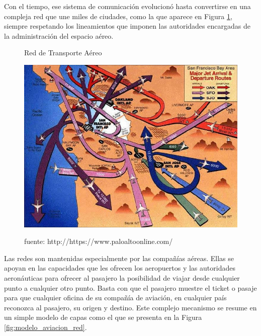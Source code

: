 Con el tiempo, ese sistema de comunicación evolucionó hasta convertirse en una compleja red que une miles de ciudades, como la que aparece en Figura \ref{fig:AirTrafficNetwork}, siempre respetando los lineamientos que imponen las autoridades encargadas de la administración del espacio aéreo. \\


\begin{figure}[h!]
	\captionsetup{justification = raggedright, singlelinecheck = false}
	\caption{Red de Transporte Aéreo} 
	\centering
	\includegraphics[scale=0.4]{Imagenes/AirTrafficNetwork}
	\label{fig:AirTrafficNetwork}
	\caption*{fuente: http://https://www.paloaltoonline.com/}
\end{figure}

Las redes son mantenidas especialmente por las compañías aéreas. Ellas se apoyan en las capacidades que les ofrecen los aeropuertos y las autoridades aeronáuticas para ofrecer al pasajero la posibilidad de viajar desde cualquier punto a cualquier otro punto. Basta con que el pasajero muestre el ticket o pasaje para que cualquier oficina de su compañía de aviación, en cualquier país reconozca al pasajero, su origen y destino. Este complejo mecanismo se resume en un simple modelo de capas como el que se presenta en la Figura \ref{fig:modelo_aviacion_red}. \\


